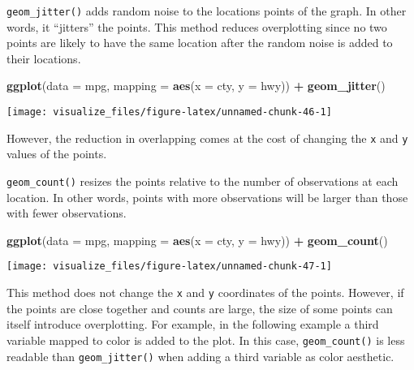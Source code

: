\documentclass[]{book}
\newenvironment{Shaded}{\begin{snugshade}}{\end{snugshade}}
\newcommand{\DataTypeTok}[1]{\textcolor[rgb]{0.13,0.29,0.53}{#1}}
\newcommand{\KeywordTok}[1]{\textcolor[rgb]{0.13,0.29,0.53}{\textbf{#1}}}
\newcommand{\NormalTok}[1]{#1}
\newcommand{\OperatorTok}[1]{\textcolor[rgb]{0.81,0.36,0.00}{\textbf{#1}}}
\newcommand{\StringTok}[1]{\textcolor[rgb]{0.31,0.60,0.02}{#1}}
\theoremstyle{plain}
\theoremstyle{remark}
\theoremstyle{definition}
\theoremstyle{definition}
\theoremstyle{definition}
\theoremstyle{remark}
\begin{document}
\texttt{geom\_jitter()} adds random noise to the locations points of the
graph. In other words, it ``jitters'' the points. This method reduces
overplotting since no two points are likely to have the same location
after the random noise is added to their locations.

\begin{Shaded}
\begin{Highlighting}[]
\KeywordTok{ggplot}\NormalTok{(}\DataTypeTok{data =}\NormalTok{ mpg, }\DataTypeTok{mapping =} \KeywordTok{aes}\NormalTok{(}\DataTypeTok{x =}\NormalTok{ cty, }\DataTypeTok{y =}\NormalTok{ hwy)) }\OperatorTok{+}
\StringTok{  }\KeywordTok{geom_jitter}\NormalTok{()}
\end{Highlighting}
\end{Shaded}

\begin{center}\texttt{[image: visualize\_files/figure-latex/unnamed-chunk-46-1]} \end{center}

However, the reduction in overlapping comes at the cost of changing the
\texttt{x} and \texttt{y} values of the points.

\texttt{geom\_count()} resizes the points relative to the number of
observations at each location. In other words, points with more
observations will be larger than those with fewer observations.

\begin{Shaded}
\begin{Highlighting}[]
\KeywordTok{ggplot}\NormalTok{(}\DataTypeTok{data =}\NormalTok{ mpg, }\DataTypeTok{mapping =} \KeywordTok{aes}\NormalTok{(}\DataTypeTok{x =}\NormalTok{ cty, }\DataTypeTok{y =}\NormalTok{ hwy)) }\OperatorTok{+}
\StringTok{  }\KeywordTok{geom_count}\NormalTok{()}
\end{Highlighting}
\end{Shaded}

\begin{center}\texttt{[image: visualize\_files/figure-latex/unnamed-chunk-47-1]} \end{center}

This method does not change the \texttt{x} and \texttt{y} coordinates of
the points. However, if the points are close together and counts are
large, the size of some points can itself introduce overplotting. For
example, in the following example a third variable mapped to color is
added to the plot. In this case, \texttt{geom\_count()} is less readable
than \texttt{geom\_jitter()} when adding a third variable as color
aesthetic.
\end{document}
